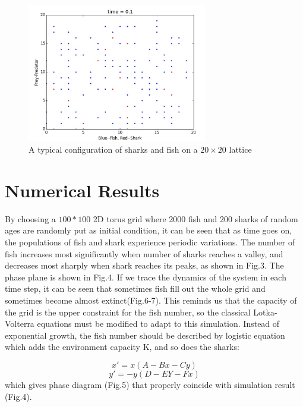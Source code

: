 \documentclass[aps,prl,preprint,superscriptaddress]{revtex4}
\begin{document}
\begin{figure}[H]
	\centering
	\includegraphics[width = 0.7\textwidth]{example}
	\caption{A typical configuration of sharks and fish on a $20 \times 20$ lattice}
	\label{ex} 
\end{figure}

\pagebreak
\section{Numerical Results}

By choosing a $100*100$ 2D torus grid where 2000 fish and 200 sharks of random ages are randomly put as initial condition, it can be seen that as time goes on, the populations of fish and shark experience periodic variations. The number of fish increases most significantly when number of sharks reaches a valley, and decreases most sharply when shark reaches its peaks, as shown in Fig.3. The phase plane is shown in Fig.4. If we trace the dynamics of the system in each time step, it can be seen that sometimes fish fill out the whole grid and sometimes become almost extinct(Fig.6-7). This reminds us that the capacity of the grid is the upper constraint for the fish number, so the classical Lotka-Volterra equations must be modified to adapt to this simulation. Instead of exponential growth, the fish number should be described by logistic equation which adds the environment capacity K, and so does the sharks:

\begin{equation}
x' = x(A - Bx - Cy)
\end{equation}
\begin{equation}
y' = -y(D - EY -Fx)
\end{equation}
which gives phase diagram (Fig.5) that properly coincide with simulation result (Fig.4).
\end{document}
